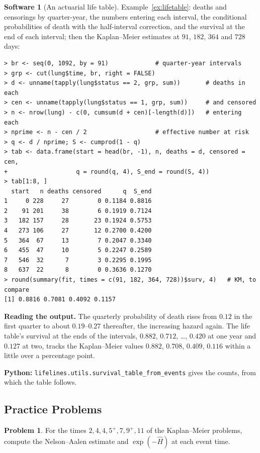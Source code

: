 \documentclass[11pt,a4paper]{article}
\numberwithin{equation}{section}
\theoremstyle{definition}
\newtheorem{software}[thm]{Software}
\newtheorem{problemx}{Problem}[subsection]
\newenvironment{problem}{\begin{problemx}}{\end{problemx}}
\begin{document}
\begin{software}[An actuarial life table]
\label{sw:lifetable}
Example~\ref{ex:lifetable}: deaths and censorings by quarter-year, the numbers entering each interval, the conditional probabilities of death with the half-interval correction, and the survival at the end of each interval; then the Kaplan--Meier estimates at $91$, $182$, $364$ and $728$ days:
{\small\begin{verbatim}
> br <- seq(0, 1092, by = 91)             # quarter-year intervals
> grp <- cut(lung$time, br, right = FALSE)
> d <- unname(tapply(lung$status == 2, grp, sum))       # deaths in each
> cen <- unname(tapply(lung$status == 1, grp, sum))     # and censored
> n <- nrow(lung) - c(0, cumsum(d + cen)[-length(d)])   # entering each
> nprime <- n - cen / 2                   # effective number at risk
> q <- d / nprime; S <- cumprod(1 - q)
> tab <- data.frame(start = head(br, -1), n, deaths = d, censored = cen,
+                   q = round(q, 4), S_end = round(S, 4))
> tab[1:8, ]
  start   n deaths censored      q  S_end
1     0 228     27        0 0.1184 0.8816
2    91 201     38        6 0.1919 0.7124
3   182 157     28       23 0.1924 0.5753
4   273 106     27       12 0.2700 0.4200
5   364  67     13        7 0.2047 0.3340
6   455  47     10        5 0.2247 0.2589
7   546  32      7        3 0.2295 0.1995
8   637  22      8        0 0.3636 0.1270
> round(summary(fit, times = c(91, 182, 364, 728))$surv, 4)   # KM, to compare
[1] 0.8816 0.7081 0.4092 0.1157
\end{verbatim}}
\textbf{Reading the output.} The quarterly probability of death rises from $0.12$ in the first quarter to about $0.19$--$0.27$ thereafter, the increasing hazard again. The life table's survival at the ends of the intervals, $0.882$, $0.712$, \ldots, $0.420$ at one year and $0.127$ at two, tracks the Kaplan--Meier values $0.882$, $0.708$, $0.409$, $0.116$ within a little over a percentage point.

\textbf{Python:} \texttt{lifelines.utils.survival\_table\_from\_events} gives the counts, from which the table follows.
\end{software}

\subsection{Practice Problems}

\begin{problem}
For the times $2, 4, 4, 5^+, 7, 9^+, 11$ of the Kaplan--Meier problems, compute the Nelson--Aalen estimate and $\exp(-\hat H)$ at each event time.
\end{problem}
\end{document}
